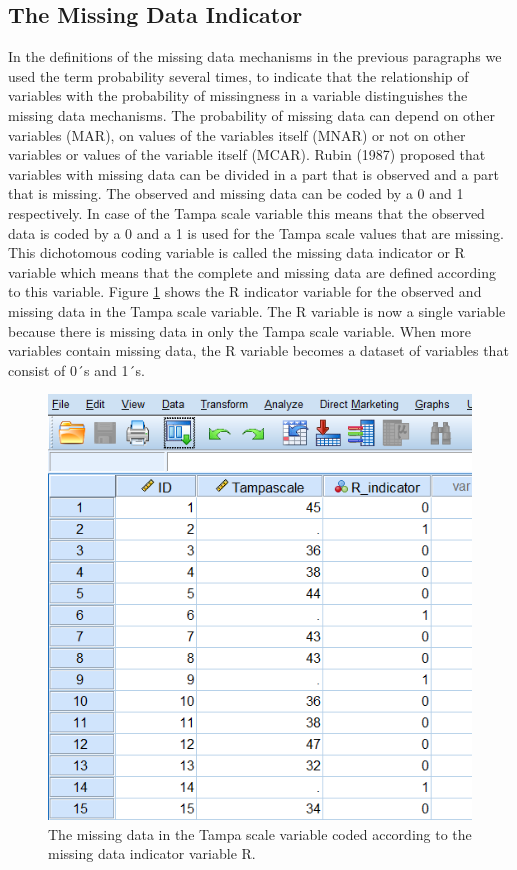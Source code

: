 \documentclass[]{book}
\theoremstyle{definition}
\theoremstyle{definition}
\theoremstyle{definition}
\theoremstyle{remark}
\begin{document}
\subsection{The Missing Data
Indicator}\label{the-missing-data-indicator}

In the definitions of the missing data mechanisms in the previous
paragraphs we used the term probability several times, to indicate that
the relationship of variables with the probability of missingness in a
variable distinguishes the missing data mechanisms. The probability of
missing data can depend on other variables (MAR), on values of the
variables itself (MNAR) or not on other variables or values of the
variable itself (MCAR). Rubin (1987) proposed that variables with
missing data can be divided in a part that is observed and a part that
is missing. The observed and missing data can be coded by a 0 and 1
respectively. In case of the Tampa scale variable this means that the
observed data is coded by a 0 and a 1 is used for the Tampa scale values
that are missing. This dichotomous coding variable is called the missing
data indicator or R variable which means that the complete and missing
data are defined according to this variable. Figure \ref{fig:fig2-8}
shows the R indicator variable for the observed and missing data in the
Tampa scale variable. The R variable is now a single variable because
there is missing data in only the Tampa scale variable. When more
variables contain missing data, the R variable becomes a dataset of
variables that consist of 0´s and 1´s.

\begin{figure}

{\centering \includegraphics[width=0.9\linewidth]{images/fig2.8} 

}

\caption{The missing data in the Tampa scale variable coded according to the missing data indicator variable R.}\label{fig:fig2-8}
\end{figure}
\end{document}
